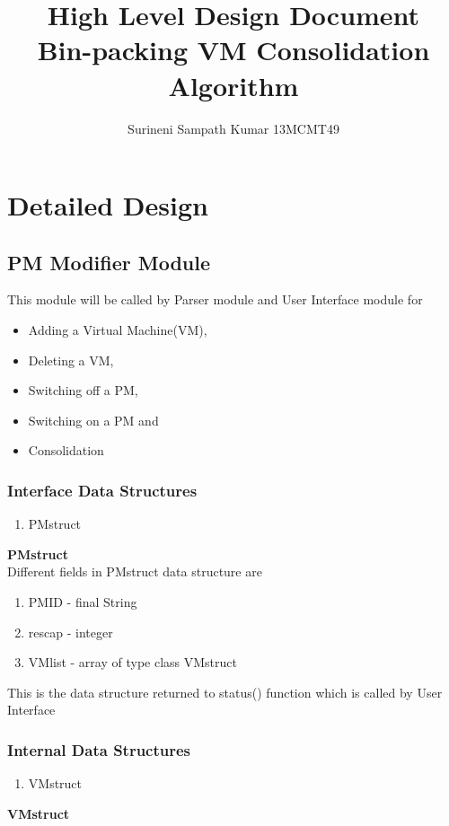 \documentclass[a4paper,11pt]{article}
\title{High Level Design Document \\ Bin-packing VM Consolidation Algorithm}
\author{Surineni Sampath Kumar 13MCMT49}
\date{}
\begin{document}
\maketitle
\pagebreak
\tableofcontents
\pagebreak

\section{Detailed Design}
\subsection{PM Modifier Module}
This module will be called by Parser module and User Interface module for
\begin{itemize}
 \item Adding a Virtual Machine(VM),
 \item Deleting a VM,
 \item Switching off a PM,
 \item Switching on a PM and 
 \item Consolidation
\end{itemize}
\subsubsection{Interface Data Structures}
\begin{enumerate}
 \item PMstruct
 \end{enumerate}
\textbf{PMstruct}
\\

Different fields in PMstruct data structure are 
\begin{enumerate}
 \item PM\textunderscore ID - final String
 \item res\textunderscore cap - integer
 \item VM\textunderscore list - array of type class VMstruct
\end{enumerate}

This is the data structure returned to status() function which is called by User Interface
\\
\subsubsection{Internal Data Structures}
\begin{enumerate}
 \item VMstruct
\end{enumerate}
\textbf{VMstruct}
\\
\end{document}
